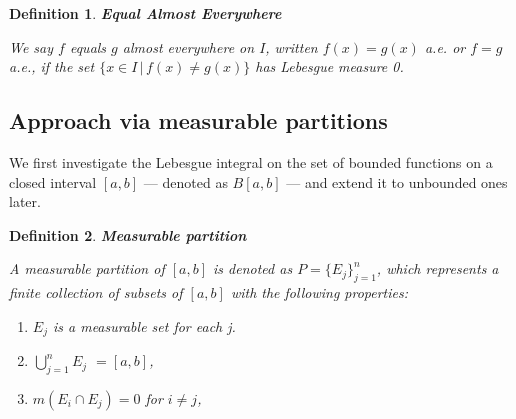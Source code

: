 \documentclass[12pt]{amsart}
\newtheorem{definition}{Definition}
\theoremstyle{plain}
\theoremstyle{definition}
\theoremstyle{remark}
\numberwithin{equation}{section}
\numberwithin{thm}{section}
\begin{document}
%


\begin{definition}
\textbf{Equal Almost Everywhere}

We say $f$ equals $g$ almost everywhere on $I$, written $f(x) = g(x)$ a.e. or $f = g$ a.e., if the set $\{x \in I \,|\, f(x) \neq g(x)\}$ has Lebesgue measure 0.
\end{definition}






\subsection{Approach via measurable partitions}

We first investigate the Lebesgue integral on the set of bounded functions on a closed interval $[a,b]$ --- denoted as \textbf{$B[a,b]$} --- and extend it to unbounded ones later.

\begin{definition}
    \textbf{Measurable partition}

A measurable partition of $[a, b]$ is denoted as $P = \{E_j\}_{j=1}^n$, which represents a finite collection of subsets of $[a, b]$ with the following properties:
\begin{enumerate}
  \item[(i)] $E_j$ is a measurable set for each j.
  \item[(ii)]$\bigcup_{j=1}^n E_j$ $=[a,b]$,
  \item[(iii)] $m(E_i \cap E_{j}) = 0$ for $i \neq j$, 
\end{enumerate}
\end{definition}
\end{document}
